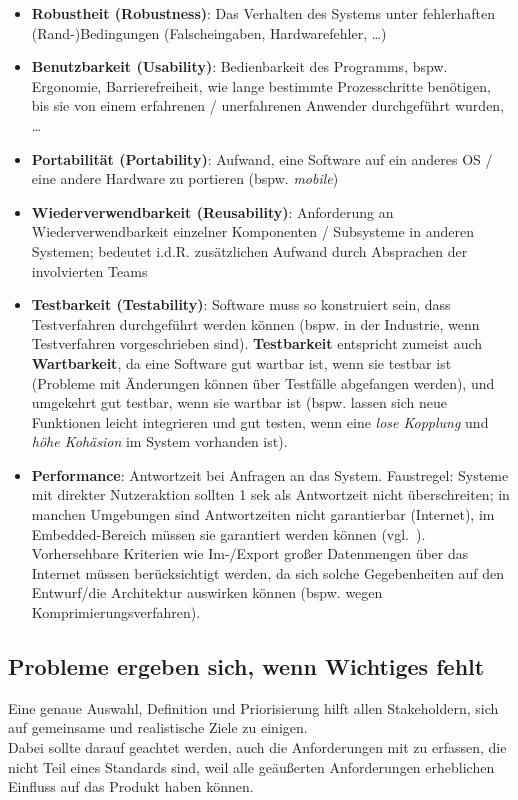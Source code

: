 \begin{itemize}
    \item \textbf{Robustheit (Robustness)}: Das Verhalten des Systems unter fehlerhaften (Rand-)Bedingungen (Falscheingaben, Hardwarefehler, \ldots)
    \item \textbf{Benutzbarkeit (Usability)}: Bedienbarkeit des Programms, bspw. Ergonomie, Barrierefreiheit, wie lange bestimmte Prozesschritte benötigen, bis sie von einem erfahrenen / unerfahrenen Anwender durchgeführt wurden, \ldots
    \item \textbf{Portabilität (Portability)}: Aufwand, eine Software auf ein anderes OS / eine andere Hardware zu portieren (bspw. \textit{mobile})
    \item \textbf{Wiederverwendbarkeit (Reusability)}: Anforderung an Wiederverwendbarkeit einzelner Komponenten / Subsysteme in anderen Systemen; bedeutet i.d.R. zusätzlichen Aufwand durch Absprachen der involvierten Teams
    \item \textbf{Testbarkeit (Testability)}: Software muss so konstruiert sein, dass Testverfahren durchgeführt werden können (bspw. in der Industrie, wenn Testverfahren vorgeschrieben sind). \textbf{Testbarkeit} entspricht zumeist auch \textbf{Wartbarkeit}, da eine Software gut wartbar ist, wenn sie testbar ist (Probleme mit Änderungen können über Testfälle abgefangen werden), und umgekehrt gut testbar, wenn sie wartbar ist (bspw. lassen sich neue Funktionen leicht integrieren und gut testen, wenn eine \textit{lose Kopplung} und \textit{höhe Kohäsion} im System vorhanden ist).
    \item \textbf{Performance}: Antwortzeit bei Anfragen an das System.
    Faustregel: Systeme mit direkter Nutzeraktion sollten 1 sek als Antwortzeit nicht überschreiten; in manchen Umgebungen sind Antwortzeiten nicht garantierbar (Internet), im Embedded-Bereich müssen sie garantiert werden können (vgl.~\cite[62]{Wed09}).
    Vorhersehbare Kriterien wie Im-/Export großer Datenmengen über das Internet müssen berücksichtigt werden, da sich solche Gegebenheiten auf den Entwurf/die Architektur auswirken können (bspw. wegen Komprimierungsverfahren).
\end{itemize}


\subsection*{Probleme ergeben sich, wenn Wichtiges fehlt}
Eine genaue Auswahl, Definition und Priorisierung hilft allen Stakeholdern, sich auf gemeinsame und realistische Ziele zu einigen.\\
Dabei sollte darauf geachtet werden, auch die Anforderungen mit zu erfassen, die nicht Teil eines Standards sind, weil alle geäußerten Anforderungen erheblichen Einfluss auf das Produkt haben können.


